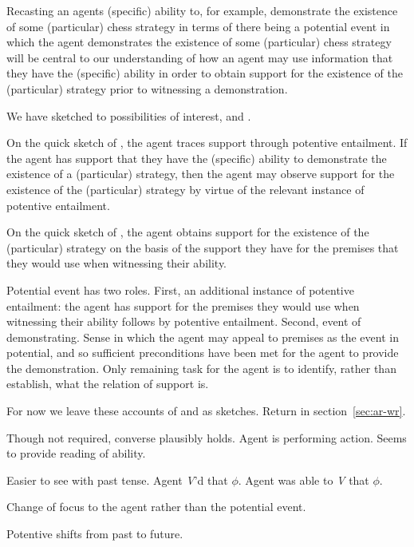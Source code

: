 \begin{note}
  Recasting an agents (specific) ability to, for example, demonstrate the existence of some (particular) chess strategy in terms of there being a potential event in which the agent demonstrates the existence of some (particular) chess strategy will be central to our understanding of how an agent may use information that they have the (specific) ability in order to obtain support for the existence of the (particular) strategy prior to witnessing a demonstration.

  We have sketched to possibilities of interest, \AR{} and \WR{}.

  On the quick sketch of \AR{}, the agent traces support through potentive entailment.
  If the agent has support that they have the (specific) ability to demonstrate the existence of a (particular) strategy, then the agent may observe support for the existence of the (particular) strategy by virtue of the relevant instance of potentive entailment.

  On the quick sketch of \WR{}, the agent obtains support for the existence of the (particular) strategy on the basis of the support they have for the premises that they would use when witnessing their ability.

  Potential event has two roles.
  First, an additional instance of potentive entailment: the agent has support for the premises they would use when witnessing their ability follows by potentive entailment.
  Second, event of demonstrating.
  Sense in which the agent may appeal to premises as the event in potential, and so sufficient preconditions have been met for the agent to provide the demonstration.
  Only remaining task for the agent is to identify, rather than establish, what the relation of support is.

  For now we leave these accounts of \AR{} and \WR{} as sketches.
  Return in section~\ref{sec:ar-wr}.
\end{note}



\begin{note}
  Though not required, converse plausibly holds.
  Agent is performing action.
  Seems to provide reading of ability.

  Easier to see with past tense.
  Agent \emph{V}'d that \(\phi\).
  Agent was able to \emph{V} that \(\phi\).

  Change of focus to the agent rather than the potential event.

  Potentive shifts from past to future.
\end{note}

